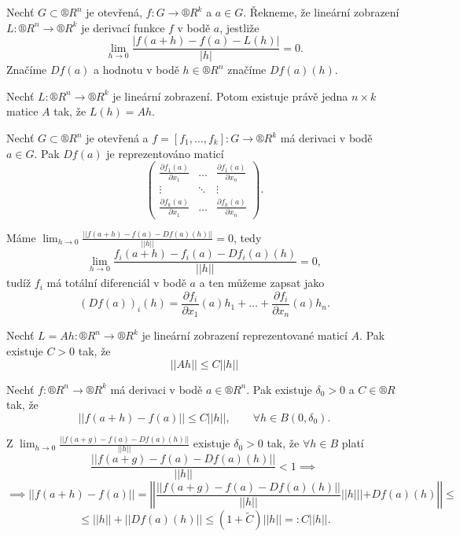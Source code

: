 \documentclass[12pt]{article}					%
\begin{document}
	\begin{definice}
		Nechť $G \subset ®R^n$ je otevřená, $f: G \rightarrow ®R^k$ a $a \in G$. Řekneme, že lineární zobrazení $L: ®R^n \rightarrow ®R^k$ je derivací funkce $f$ v bodě $a$, jestliže
		$$ \lim_{h \rightarrow 0} \frac{|f(a + h) - f(a) - L(h)|}{|h|} = 0. $$
		Značíme $D f(a)$ a hodnotu v bodě $h \in ®R^n$ značíme $D f(a)(h)$.
	\end{definice}

	\begin{poznamka}
		Nechť $L: ®R^n \rightarrow ®R^k$ je lineární zobrazení. Potom existuje právě jedna $n \times k$ matice $A$ tak, že $L(h) = A h$.
	\end{poznamka}


	\begin{veta}
		Nechť $G \subset ®R^n$ je otevřená a $f = [f_1, …, f_k]: G \rightarrow ®R^k$ má derivaci v bodě $a \in G$. Pak $D f(a)$ je reprezentováno maticí
		$$ \begin{pmatrix} \frac{\partial f_1(a)}{\partial x_1} & … & \frac{\partial f_1(a)}{\partial x_n} \\ \vdots & \ddots & \vdots \\ \frac{\partial f_k(a)}{\partial x_1} & … & \frac{\partial f_k(a)}{\partial x_n} \end{pmatrix}. $$

		\begin{dukazin}
			Máme $\lim_{h → 0} \frac{||f(a + h) - f(a) - D f(a)(h)||}{||h||} = 0$, tedy
			$$ \lim_{h → 0} \frac{f_i(a + h) - f_i(a) - D f_i(a)(h)}{||h||} = 0, $$
			tudíž $f_i$ má totální diferenciál v bodě $a$ a ten můžeme zapsat jako
			$$ (D f(a))_i(h) = \frac{\partial f_i}{\partial x_1}(a) h_1 + … + \frac{\partial f_i}{\partial x_n}(a)h_n. $$
		\end{dukazin}
	\end{veta}

	\begin{poznamka}
		Nechť $L = A h: ®R^n \rightarrow ®R^k$ je lineární zobrazení reprezentované maticí $A$. Pak existuje $C > 0$ tak, že
		$$ ||A h|| ≤ C ||h|| $$
	\end{poznamka}

	\begin{lemma}
		Nechť $f: ®R^n \rightarrow ®R^k$ má derivaci v bodě $a \in ®R^n$. Pak existuje $\delta_0 > 0$ a $C \in ®R$ tak, že
		$$ ||f(a + h) - f(a)|| ≤ C||h||, \qquad \forall h \in B(0, \delta_0). $$

		\begin{dukazin}
			Z $\lim_{h \rightarrow 0} \frac{||f(a + g) - f(a) - D f(a)(h)||}{||h||}$ existuje $\delta_0 > 0$ tak, že $\forall h \in B$ platí
			$$ \frac{||f(a + g) - f(a) - D f(a)(h)||}{||h||} < 1 \implies $$
			$$ \implies ||f(a + h) - f(a)|| = \left|\left| \frac{||f(a + g) - f(a) - D f(a)(h)||}{||h||}||h||| + D f(a)(h)\right|\right| ≤ $$
			$$ ≤ ||h|| + ||D f(a)(h)|| ≤ (1 + \tilde C)||h|| =: C ||h||. $$
		\end{dukazin}
	\end{lemma}
\end{document}
